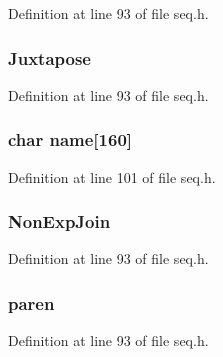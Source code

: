 Definition at line 93 of file seq.\-h.

\hypertarget{struct_s_e_q_i_n_f_o_a0219338882bcb93b1e10e86ed799972d}{
\subsubsection[{Juxtapose}]{ Juxtapose}}\label{struct_s_e_q_i_n_f_o_a0219338882bcb93b1e10e86ed799972d}


Definition at line 93 of file seq.\-h.

\hypertarget{struct_s_e_q_i_n_f_o_ad6aa4dabee2ee797b0250c38ebe01475}{
\subsubsection[{name}]{\setlength{\rightskip}{0pt plus 5cm}char name\mbox{[}160\mbox{]}}}\label{struct_s_e_q_i_n_f_o_ad6aa4dabee2ee797b0250c38ebe01475}


Definition at line 101 of file seq.\-h.

\hypertarget{struct_s_e_q_i_n_f_o_a8326c03098d6785baf216333744fac37}{
\subsubsection[{Non\-Exp\-Join}]{ Non\-Exp\-Join}}\label{struct_s_e_q_i_n_f_o_a8326c03098d6785baf216333744fac37}


Definition at line 93 of file seq.\-h.

\hypertarget{struct_s_e_q_i_n_f_o_aa57615161b7717166daaa36586302c0c}{
\subsubsection[{paren}]{ paren}}\label{struct_s_e_q_i_n_f_o_aa57615161b7717166daaa36586302c0c}


Definition at line 93 of file seq.\-h.

